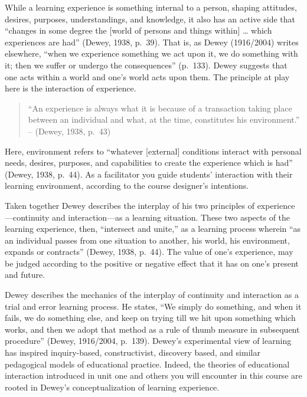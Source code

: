 \documentclass[
]{book}
\begin{document}
While a learning experience is something internal to a person, shaping attitudes, desires, purposes, understandings, and knowledge, it also has an active side that ``changes in some degree the {[}world of persons and things within{]} \ldots{} which experiences are had'' (Dewey, 1938, p.~39). That is, as Dewey (1916/2004) writes elsewhere, ``when we experience something we act upon it, we do something with it; then we suffer or undergo the consequences'' (p.~133). Dewey suggests that one acts within a world and one's world acts upon them. The principle at play here is the interaction of experience.

\begin{quote}
``An experience is always what it is because of a transaction taking place between an individual and what, at the time, constitutes his environment.'' -- (Dewey, 1938, p.~43)
\end{quote}

Here, environment refers to ``whatever {[}external{]} conditions interact with personal needs, desires, purposes, and capabilities to create the experience which is had'' (Dewey, 1938, p.~44). As a facilitator you guide students' interaction with their learning environment, according to the course designer's intentions.

Taken together Dewey describes the interplay of his two principles of experience---continuity and interaction---as a learning situation. These two aspects of the learning experience, then, ``intersect and unite,'' as a learning process wherein ``as an individual passes from one situation to another, his world, his environment, expands or contracts'' (Dewey, 1938, p.~44). The value of one's experience, may be judged according to the positive or negative effect that it has on one's present and future.

Dewey describes the mechanics of the interplay of continuity and interaction as a trial and error learning process. He states, ``We simply do something, and when it fails, we do something else, and keep on trying till we hit upon something which works, and then we adopt that method as a rule of thumb measure in subsequent procedure'' (Dewey, 1916/2004, p.~139). Dewey's experimental view of learning has inspired inquiry-based, constructivist, discovery based, and similar pedagogical models of educational practice. Indeed, the theories of educational interaction introduced in unit one and others you will encounter in this course are rooted in Dewey's conceptualization of learning experience.
\end{document}
